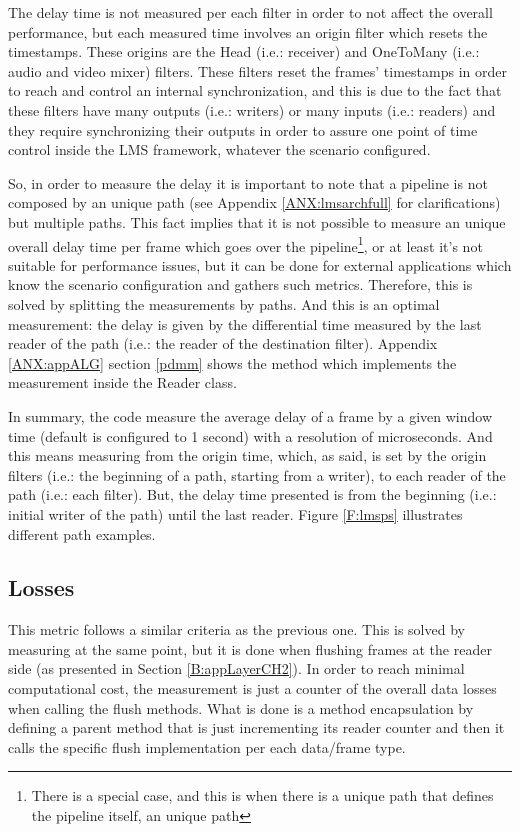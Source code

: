 The delay time is not measured per each filter in order to not affect the overall performance, but each measured time involves an origin filter which resets the timestamps. These origins are the Head (i.e.: receiver) and OneToMany (i.e.: audio and video mixer) filters. These filters reset the frames' timestamps in order to reach and control an internal synchronization, and this is due to the fact that these filters have many outputs (i.e.: writers) or many inputs (i.e.: readers) and they require synchronizing their outputs in order to assure one point of time control inside the LMS framework, whatever the scenario configured.

So, in order to measure the delay it is important to note that a pipeline is not composed by an unique path (see Appendix \ref{ANX:lmsarchfull} for clarifications) but multiple paths. This fact implies that it is not possible to measure an unique overall delay time per frame which goes over the pipeline\footnote{There is a special case, and this is when there is a unique path that defines the pipeline itself, an unique path}, or at least it's not suitable for performance issues, but it can be done for external applications which know the scenario configuration and gathers such metrics. Therefore, this is solved by splitting the measurements by paths. And this is an optimal measurement: the delay is given by the differential time measured by the last reader of the path (i.e.: the reader of the destination filter). Appendix \ref{ANX:appALG} section \ref{pdmm} shows the method which implements the measurement inside the Reader class.

In summary, the code measure the average delay of a frame by a given window time (default is configured to 1 second) with a resolution of microseconds. And this means measuring from the origin time, which, as said, is set by the origin filters (i.e.: the beginning of a path, starting from a writer), to each reader of the path (i.e.: each filter). But, the delay time presented is from the beginning (i.e.: initial writer of the path) until the last reader. Figure \ref{F:lmsps} illustrates different path examples.

\subsection{Losses}

This metric follows a similar criteria as the previous one. This is solved by measuring at the same point, but it is done when flushing frames at the reader side (as presented in Section \ref{B:appLayerCH2}). In order to reach minimal computational cost, the measurement is just a counter of the overall data losses when calling the flush methods. What is done is a method encapsulation by defining a parent method that is just incrementing its reader counter and then it calls the specific flush implementation per each data/frame type.

